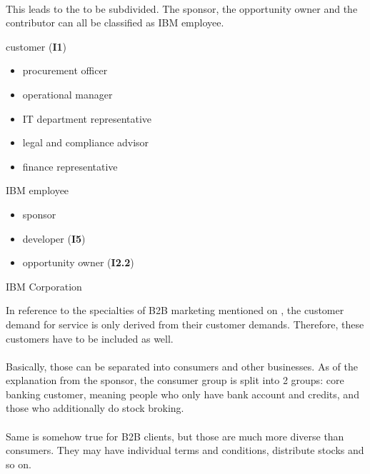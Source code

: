 \paragraph{} This leads to the  to be subdivided. The sponsor, the opportunity owner and the contributor can all be classified as IBM employee.

\begin{closeItemCol}
    \item customer (\textbf{I1})
    \begin{itemize}
        \item procurement officer
        \item operational manager
        \item IT department representative
        \item legal and compliance advisor
        \item finance representative
    \end{itemize} \columnbreak
    
    \item IBM employee 
    \begin{itemize}
        \item sponsor
        \item developer (\textbf{I5})
        \item opportunity owner (\textbf{I2.2})
    \end{itemize}
    \item IBM Corporation
\end{closeItemCol}

In reference to the specialties of B2B marketing mentioned on \cpageref{}, the customer demand for service is only derived from their customer demands. Therefore, these customers have to be included as well. 

\paragraph{} Basically, those can be separated into consumers and other businesses. As of the explanation from the sponsor, the consumer group is split into 2 groups: core banking customer, meaning people who only have bank account and credits, and those who additionally do stock broking. 

\paragraph{} Same is somehow true for B2B clients, but those are much more diverse than consumers. They may have individual terms and conditions, distribute stocks and so on. 

